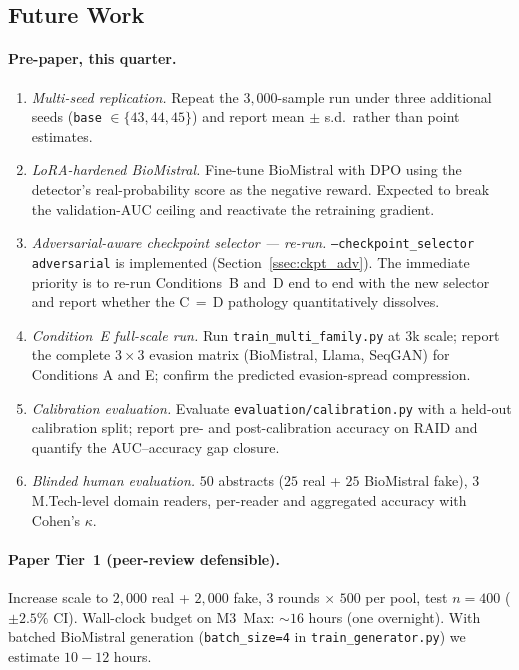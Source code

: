 \subsection{Future Work}
\label{ssec:future}

\paragraph{Pre-paper, this quarter.}
\begin{enumerate}[leftmargin=*]
\item \emph{Multi-seed replication.} Repeat the
  \(3{,}000\)-sample run under three additional seeds
  (\texttt{base} $\in \{43, 44, 45\}$) and report mean $\pm$ s.d.\
  rather than point estimates.
\item \emph{LoRA-hardened BioMistral.} Fine-tune BioMistral with DPO
  using the detector's real-probability score as the negative reward.
  Expected to break the validation-AUC ceiling and reactivate the
  retraining gradient.
\item \emph{Adversarial-aware checkpoint selector — re-run.}
  \texttt{--checkpoint\_selector adversarial} is implemented
  (Section~\ref{ssec:ckpt_adv}). The immediate priority is to re-run
  Conditions~B and~D end to end with the new selector and report
  whether the C\,$=$\,D pathology quantitatively dissolves.
\item \emph{Condition~E full-scale run.} Run
  \texttt{train\_multi\_family.py} at \(3\)k scale; report the complete
  $3\times 3$ evasion matrix (BioMistral, Llama, SeqGAN) for Conditions
  A and E; confirm the predicted evasion-spread compression.
\item \emph{Calibration evaluation.} Evaluate
  \texttt{evaluation/calibration.py} with a held-out calibration split;
  report pre- and post-calibration accuracy on RAID and quantify the
  AUC--accuracy gap closure.
\item \emph{Blinded human evaluation.} \(50\) abstracts (\(25\)
  real + \(25\) BioMistral fake), \(3\) M.Tech-level domain readers,
  per-reader and aggregated accuracy with Cohen's $\kappa$.
\end{enumerate}

\paragraph{Paper Tier~1 (peer-review defensible).}
Increase scale to \(2{,}000\) real + \(2{,}000\) fake, \(3\) rounds
$\times$ \(500\) per pool, test \(n=400\) (\(\pm 2.5\%\) CI). Wall-clock
budget on M3~Max: $\sim$\(16\) hours (one overnight). With batched
BioMistral generation (\texttt{batch\_size=4} in
\texttt{train\_generator.py}) we estimate
\(10\!-\!12\) hours.


